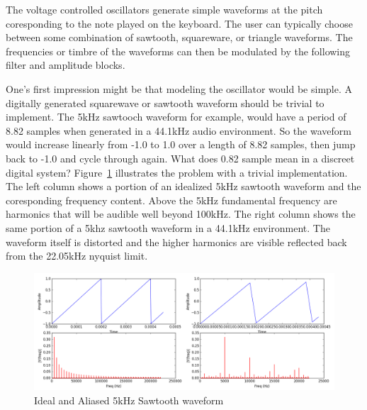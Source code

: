 The voltage controlled oscillators generate simple waveforms at the pitch coresponding to the note played on the keyboard. The user can typically choose between some combination of sawtooth, squareware, or triangle waveforms. The frequencies or timbre of the waveforms can then be modulated by the following filter and amplitude blocks.

One's first impression might be that modeling the oscillator would be simple. A digitally generated squarewave or sawtooth waveform should be trivial to implement. The 5kHz sawtooch waveform for example, would have a period of 8.82 samples when generated in a 44.1kHz audio environment. So the waveform would increase linearly from -1.0 to 1.0 over a length of 8.82 samples, then jump back to -1.0 and cycle through again. What does 0.82 sample mean in a discreet digital system? Figure~\ref{fig:aliasing_sawtooth} illustrates the problem with a trivial implementation. The left column shows a portion of an idealized 5kHz sawtooth waveform and the coresponding frequency content. Above the 5kHz fundamental frequency are harmonics that will be audible well beyond 100kHz. The right column shows the same portion of a 5khz sawtooth waveform in a 44.1kHz environment. The waveform itself is distorted and the higher harmonics are visible reflected back from the 22.05kHz nyquist limit.

\begin{figure}[h]
    \centering
    \includegraphics[width=\textwidth]{plots/graphics/sawtooth.png}
    \caption{Ideal and Aliased 5kHz Sawtooth waveform}
    \label{fig:aliasing_sawtooth}
\end{figure}
